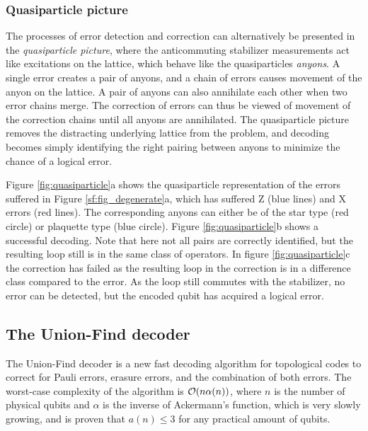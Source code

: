 \subsubsection{Quasiparticle picture}
The processes of error detection and correction can alternatively be presented in the \emph{quasiparticle picture}, where the anticommuting stabilizer measurements act like excitations on the lattice, which behave like the quasiparticles \emph{anyons}. A single error creates a pair of anyons, and a chain of errors causes movement of the anyon on the lattice. A pair of anyons can also annihilate each other when two error chains merge. The correction of errors can thus be viewed of movement of the correction chains until all anyons are annihilated. The quasiparticle picture removes the distracting underlying lattice from the problem, and decoding becomes simply identifying the right pairing between anyons to minimize the chance of a logical error.

Figure \ref{fig:quasiparticle}a shows the quasiparticle representation of the errors suffered in Figure \ref{sf:fig_degenerate}a, which has suffered Z (blue lines) and X errors (red lines). The corresponding anyons can either be of the star type (red circle) or plaquette type (blue circle). Figure \ref{fig:quasiparticle}b shows a successful decoding. Note that here not all pairs are correctly identified, but the resulting loop still is in the same class of operators. In figure \ref{fig:quasiparticle}c the correction has failed as the resulting loop in the correction is in a difference class compared to the error. As the loop still commutes with the stabilizer, no error can be detected, but the encoded qubit has acquired a logical error.


\subsection{The Union-Find decoder}\label{sec:UFdecoder}

The Union-Find decoder is a new fast decoding algorithm for topological codes to correct for Pauli errors, erasure errors, and the combination of both errors. The worst-case complexity of the algorithm is $\mathcal{O}(n\alpha(n))$, where $n$ is the number of physical qubits and $\alpha$ is the inverse of Ackermann's function, which is very slowly growing, and is proven that $a(n)\leq 3$ for any practical amount of qubits.

